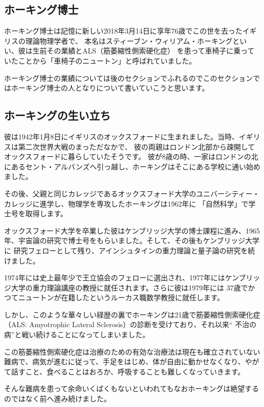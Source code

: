 \documentclass[10pt,b5paper,papersize,dvipdfmx]{jsbook}
\begin{document}
\subsection{ホーキング博士}
ホーキング博士は記憶に新しい2018年3月14日に享年76歳でこの世を去ったイギリスの理論物理学者で、
本名はスティーブン・ウィリアム・ホーキングといい、彼は生前その業績とALS（筋萎縮性側索硬化症）
を患って車椅子に乗っていたことから「車椅子のニュートン」と呼ばれていました。\par
ホーキング博士の業績については後のセクションでふれるのでこのセクションではホーキング博士の人となりについて書いていこうと思います。\par

\subsection{ホーキングの生い立ち}
彼は1942年1月8日にイギリスのオックスフォードに生まれました。当時、イギリスは第二次世界大戦のまっただなかで、
彼の両親はロンドン北部から疎開してオックスフォードに暮らしていたそうです。
彼が8歳の時、一家はロンドンの北にあるセント・アルバンズへ引っ越し、ホーキングはそこにある学校に通い始めました。\par
その後、父親と同じカレッジであるオックスフォード大学のユニバーシティー・カレッジに進学し、物理学を専攻したホーキングは1962年に
「自然科学」で学士号を取得します。\par
オックスフォード大学を卒業した彼はケンブリッジ大学の博士課程に進み、1965年、宇宙論の研究で博士号をもらいました。そして、その後もケンブリッジ大学に
研究フェローとして残り、アインシュタインの重力理論と量子論の研究を続けました。\par
1974年には史上最年少で王立協会のフェローに選出され、1977年にはケンブリッジ大学の重力理論講座の教授に就任されます。さらに彼は1979年には
37歳でかつてニュートンが在籍したというルーカス職数学教授に就任します。\par
しかし、このような華々しい経歴の裏でホーキングは21歳で筋萎縮性側索硬化症（ALS: Amyotrophic Lateral Sclerosis）の診断を受けており、それ以来“
不治の病”と戦い続けることになってしまいました。\par
この筋萎縮性側索硬化症は治療のための有効な治療法は現在も確立されていない難病で、病気が進むに従って、手足をはじめ、体が自由に動かせなくなり、やがて話すこと、食べることはおろか、呼吸することも難しくなっていきます。\par
そんな難病を患って余命いくばくもないといわれてもなおホーキングは絶望するのではなく前へ進み続けました。
\end{document}
